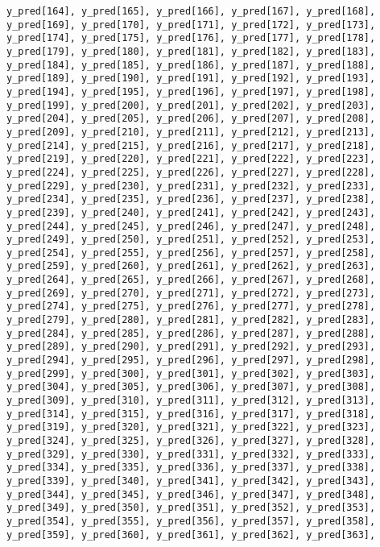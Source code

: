 \documentclass[
  letterpaper,
  DIV=11,
  numbers=noendperiod]{scrartcl}
\begin{document}
\begin{verbatim}
y_pred[164], y_pred[165], y_pred[166], y_pred[167], y_pred[168],
y_pred[169], y_pred[170], y_pred[171], y_pred[172], y_pred[173],
y_pred[174], y_pred[175], y_pred[176], y_pred[177], y_pred[178],
y_pred[179], y_pred[180], y_pred[181], y_pred[182], y_pred[183],
y_pred[184], y_pred[185], y_pred[186], y_pred[187], y_pred[188],
y_pred[189], y_pred[190], y_pred[191], y_pred[192], y_pred[193],
y_pred[194], y_pred[195], y_pred[196], y_pred[197], y_pred[198],
y_pred[199], y_pred[200], y_pred[201], y_pred[202], y_pred[203],
y_pred[204], y_pred[205], y_pred[206], y_pred[207], y_pred[208],
y_pred[209], y_pred[210], y_pred[211], y_pred[212], y_pred[213],
y_pred[214], y_pred[215], y_pred[216], y_pred[217], y_pred[218],
y_pred[219], y_pred[220], y_pred[221], y_pred[222], y_pred[223],
y_pred[224], y_pred[225], y_pred[226], y_pred[227], y_pred[228],
y_pred[229], y_pred[230], y_pred[231], y_pred[232], y_pred[233],
y_pred[234], y_pred[235], y_pred[236], y_pred[237], y_pred[238],
y_pred[239], y_pred[240], y_pred[241], y_pred[242], y_pred[243],
y_pred[244], y_pred[245], y_pred[246], y_pred[247], y_pred[248],
y_pred[249], y_pred[250], y_pred[251], y_pred[252], y_pred[253],
y_pred[254], y_pred[255], y_pred[256], y_pred[257], y_pred[258],
y_pred[259], y_pred[260], y_pred[261], y_pred[262], y_pred[263],
y_pred[264], y_pred[265], y_pred[266], y_pred[267], y_pred[268],
y_pred[269], y_pred[270], y_pred[271], y_pred[272], y_pred[273],
y_pred[274], y_pred[275], y_pred[276], y_pred[277], y_pred[278],
y_pred[279], y_pred[280], y_pred[281], y_pred[282], y_pred[283],
y_pred[284], y_pred[285], y_pred[286], y_pred[287], y_pred[288],
y_pred[289], y_pred[290], y_pred[291], y_pred[292], y_pred[293],
y_pred[294], y_pred[295], y_pred[296], y_pred[297], y_pred[298],
y_pred[299], y_pred[300], y_pred[301], y_pred[302], y_pred[303],
y_pred[304], y_pred[305], y_pred[306], y_pred[307], y_pred[308],
y_pred[309], y_pred[310], y_pred[311], y_pred[312], y_pred[313],
y_pred[314], y_pred[315], y_pred[316], y_pred[317], y_pred[318],
y_pred[319], y_pred[320], y_pred[321], y_pred[322], y_pred[323],
y_pred[324], y_pred[325], y_pred[326], y_pred[327], y_pred[328],
y_pred[329], y_pred[330], y_pred[331], y_pred[332], y_pred[333],
y_pred[334], y_pred[335], y_pred[336], y_pred[337], y_pred[338],
y_pred[339], y_pred[340], y_pred[341], y_pred[342], y_pred[343],
y_pred[344], y_pred[345], y_pred[346], y_pred[347], y_pred[348],
y_pred[349], y_pred[350], y_pred[351], y_pred[352], y_pred[353],
y_pred[354], y_pred[355], y_pred[356], y_pred[357], y_pred[358],
y_pred[359], y_pred[360], y_pred[361], y_pred[362], y_pred[363],

\end{verbatim}
\end{document}
